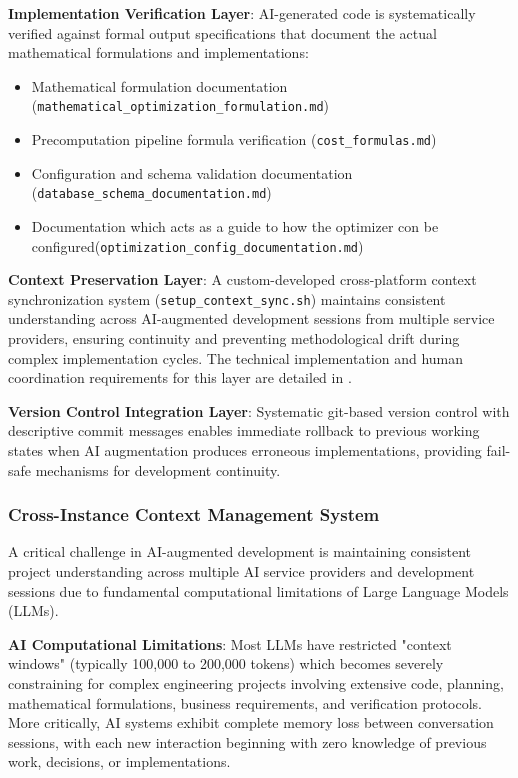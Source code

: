 \textbf{Implementation Verification Layer}: AI-generated code is systematically verified against formal output specifications that document the actual mathematical formulations and implementations:
\begin{itemize}
    \item Mathematical formulation documentation (\texttt{mathematical\_optimization\_formulation.md})
    \item Precomputation pipeline formula verification (\texttt{cost\_formulas.md})
    \item Configuration and schema validation documentation (\texttt{database\_schema\_documentation.md})
    \item Documentation which acts as a guide to how the optimizer con be configured(\texttt{optimization\_config\_documentation.md})
\end{itemize}

\textbf{Context Preservation Layer}: A custom-developed cross-platform context synchronization system (\texttt{setup\_context\_sync.sh}) maintains consistent understanding across AI-augmented development sessions from multiple service providers, ensuring continuity and preventing methodological drift during complex implementation cycles. The technical implementation and human coordination requirements for this layer are detailed in .

\textbf{Version Control Integration Layer}: Systematic git-based version control with descriptive commit messages enables immediate rollback to previous working states when AI augmentation produces erroneous implementations, providing fail-safe mechanisms for development continuity.

\subsubsection{Cross-Instance Context Management System}\label{sec:context-management}

A critical challenge in AI-augmented development is maintaining consistent project understanding across multiple AI service providers and development sessions due to fundamental computational limitations of Large Language Models (LLMs).

\textbf{AI Computational Limitations}: Most LLMs have restricted "context windows" (typically 100,000 to 200,000 tokens) which becomes severely constraining for complex engineering projects involving extensive code, planning, mathematical formulations, business requirements, and verification protocols. More critically, AI systems exhibit complete memory loss between conversation sessions, with each new interaction beginning with zero knowledge of previous work, decisions, or implementations.

